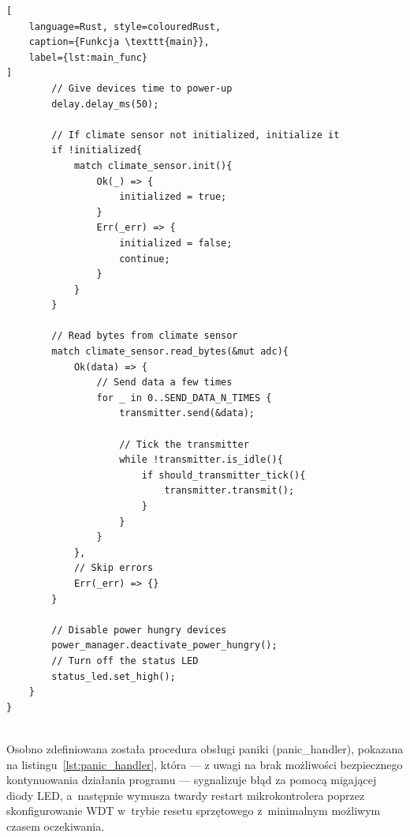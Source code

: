 \begin{lstlisting}[
    language=Rust, style=colouredRust, 
    caption={Funkcja \texttt{main}},
    label={lst:main_func}
]
        // Give devices time to power-up
        delay.delay_ms(50);

        // If climate sensor not initialized, initialize it
        if !initialized{
            match climate_sensor.init(){
                Ok(_) => {
                    initialized = true;
                }
                Err(_err) => {
                    initialized = false;
                    continue;
                }
            }
        }

        // Read bytes from climate sensor
        match climate_sensor.read_bytes(&mut adc){
            Ok(data) => {
                // Send data a few times
                for _ in 0..SEND_DATA_N_TIMES {
                    transmitter.send(&data);

                    // Tick the transmitter 
                    while !transmitter.is_idle(){
                        if should_transmitter_tick(){
                            transmitter.transmit();
                        }
                    }
                }
            },
            // Skip errors
            Err(_err) => {}
        }

        // Disable power hungry devices
        power_manager.deactivate_power_hungry();
        // Turn off the status LED
        status_led.set_high();
    }
}


\end{lstlisting}

Osobno zdefiniowana została procedura obsługi paniki (panic\_handler),
pokazana na listingu~\ref{lst:panic_handler}, 
która — z uwagi na brak możliwości bezpiecznego kontynuowania działania
programu — sygnalizuje błąd za pomocą migającej diody LED, a~następnie 
wymusza twardy restart mikrokontrolera poprzez skonfigurowanie WDT 
w~trybie resetu sprzętowego z~minimalnym możliwym czasem oczekiwania.

